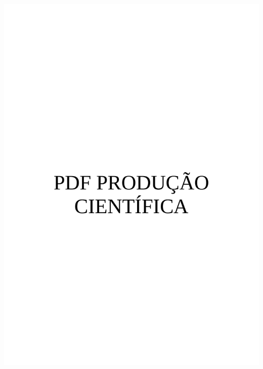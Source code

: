 \begin{producaotecnicacientifica}
\includegraphics[page=2, trim= 1.8in 0in 0in 0.7in, width=1\textwidth ]{./artigos/exemplo.pdf}
\newpage
\end{producaotecnicacientifica}
